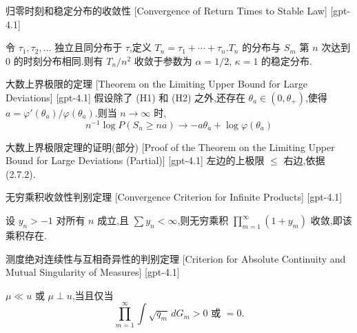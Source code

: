 \documentclass[UTF8]{ctexart}
\begin{document}
    
    
    \begin{thm}
        {归零时刻和稳定分布的收敛性}
        [Convergence of Return Times to Stable Law]
        [gpt-4.1]
        
令 $\tau_1, \tau_2, \dots$ 独立且同分布于 $\tau$,定义 $T_n = \tau_1 + \cdots + \tau_n$.$T_n$ 的分布与 $S_m$ 第 $n$ 次达到 $0$ 的时刻分布相同.则有 $T_n / n^2$ 收敛于参数为 $\alpha = 1/2$, $\kappa = 1$ 的稳定分布.

    \end{thm}
    
    
    
    \begin{thm}
        {大数上界极限的定理}
        [Theorem on the Limiting Upper Bound for Large Deviations]
        [gpt-4.1]
        假设除了 (H1) 和 (H2) 之外,还存在 $\theta_{a} \in (0, \theta_{+})$,使得 $a = \varphi'( \theta_{a} ) / \varphi( \theta_{a} )$.则当 $n \to \infty$ 时,
\[
n^{-1} \log P( S_{n} \geq n a ) \to -a \theta_{a} + \log \varphi( \theta_{a} )
\]

    \end{thm}
    
    
    
    \begin{prf}
        {大数上界极限定理的证明(部分)}
        [Proof of the Theorem on the Limiting Upper Bound for Large Deviations (Partial)]
        [gpt-4.1]
        左边的上极限 $\leq$ 右边,依据 (2.7.2).
    \end{prf}
    
    
    
    \begin{thm}
        {无穷乘积收敛性判别定理}
        [Convergence Criterion for Infinite Products]
        [gpt-4.1]
        
设 $y_{n} > -1$ 对所有 $n$ 成立,且 $\sum y_{n} < \infty$,则无穷乘积 $\prod_{m=1}^{\infty} (1 + y_{m})$ 收敛,即该乘积存在.

    \end{thm}
    
    
    
    \begin{thm}
        {测度绝对连续性与互相奇异性的判别定理}
        [Criterion for Absolute Continuity and Mutual Singularity of Measures]
        [gpt-4.1]
        
$\mu \ll 
u \text{ 或 } \mu \perp 
u$,当且仅当
\[
\prod_{m=1}^{\infty} \int \sqrt{q_m} \, dG_m > 0 \text{ 或 } = 0.
\]

    \end{thm}
    
\end{document}
